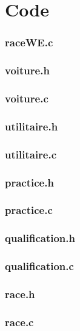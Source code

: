 \documentclass[11pt,a4paper]{article}
\begin{document}
\part{Code}
\section{raceWE.c}


\section{voiture.h}

\section{voiture.c}


\section{utilitaire.h}

\section{utilitaire.c}


\section{practice.h}

\section{practice.c}


\section{qualification.h}

\section{qualification.c}


\section{race.h}

\section{race.c}

\end{document}
